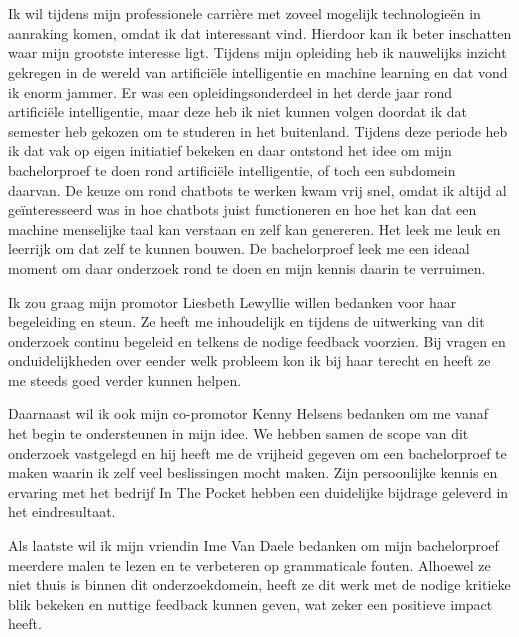 
\chapter*{}
\label{ch:voorwoord}


Ik wil tijdens mijn professionele carrière met zoveel mogelijk technologieën in aanraking komen, omdat ik dat interessant vind. Hierdoor kan ik beter inschatten waar mijn grootste interesse ligt. Tijdens mijn opleiding heb ik nauwelijks inzicht gekregen in de wereld van artificiële intelligentie en machine learning en dat vond ik enorm jammer. Er was een opleidingsonderdeel in het derde jaar rond artificiële intelligentie, maar deze heb ik niet kunnen volgen doordat ik dat semester heb gekozen om te studeren in het buitenland. Tijdens deze periode heb ik dat vak op eigen initiatief bekeken en daar ontstond het idee om mijn bachelorproef te doen rond artificiële intelligentie, of toch een subdomein daarvan. De keuze om rond chatbots te werken kwam vrij snel, omdat ik altijd al geïnteresseerd was in hoe chatbots juist functioneren en hoe het kan dat een machine menselijke taal kan verstaan en zelf kan genereren. Het leek me leuk en leerrijk om dat zelf te kunnen bouwen. De bachelorproef leek me een ideaal moment om daar onderzoek rond te doen en mijn kennis daarin te verruimen.

Ik zou graag mijn promotor Liesbeth Lewyllie willen bedanken voor haar begeleiding en steun. Ze heeft me inhoudelijk en tijdens de uitwerking van dit onderzoek continu begeleid en telkens de nodige feedback voorzien. Bij vragen en onduidelijkheden over eender welk probleem kon ik bij haar terecht en heeft ze me steeds goed verder kunnen helpen.

Daarnaast wil ik ook mijn co-promotor Kenny Helsens bedanken om me vanaf het begin te ondersteunen in mijn idee. We hebben samen de scope van dit onderzoek vastgelegd en hij heeft me de vrijheid gegeven om een bachelorproef te maken waarin ik zelf veel beslissingen mocht maken. Zijn persoonlijke kennis en ervaring met het bedrijf In The Pocket hebben een duidelijke bijdrage geleverd in het eindresultaat.

Als laatste wil ik mijn vriendin Ime Van Daele bedanken om mijn bachelorproef meerdere malen te lezen en te verbeteren op grammaticale fouten. Alhoewel ze niet thuis is binnen dit onderzoekdomein, heeft ze dit werk met de nodige kritieke blik bekeken en nuttige feedback kunnen geven, wat zeker een positieve impact heeft.
